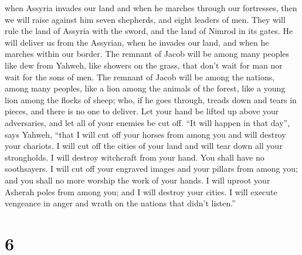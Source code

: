 when Assyria invades our land and when he marches through our
fortresses, then we will raise against him seven shepherds, and eight
leaders of men.  They will rule the land of Assyria with the
sword, and the land of Nimrod in its gates. He will deliver us from the
Assyrian, when he invades our land, and when he marches within our
border.  The remnant of Jacob will be among many peoples
like dew from Yahweh, like showers on the grass, that don't wait for man
nor wait for the sons of men.  The remnant of Jacob will be
among the nations, among many peoples, like a lion among the animals of
the forest, like a young lion among the flocks of sheep; who, if he goes
through, treads down and tears in pieces, and there is no one to
deliver.  Let your hand be lifted up above your adversaries,
and let all of your enemies be cut off.  ``It will happen
in that day'', says Yahweh, ``that I will cut off your horses from among
you and will destroy your chariots.  I will cut off the
cities of your land and will tear down all your strongholds.
 I will destroy witchcraft from your hand. You shall have
no soothsayers.  I will cut off your engraved images and
your pillars from among you; and you shall no more worship the work of
your hands.  I will uproot your Asherah poles from among
you; and I will destroy your cities.  I will execute
vengeance in anger and wrath on the nations that didn't listen.''

\hypertarget{section-2}{%
\section{6}\label{section-2}}

